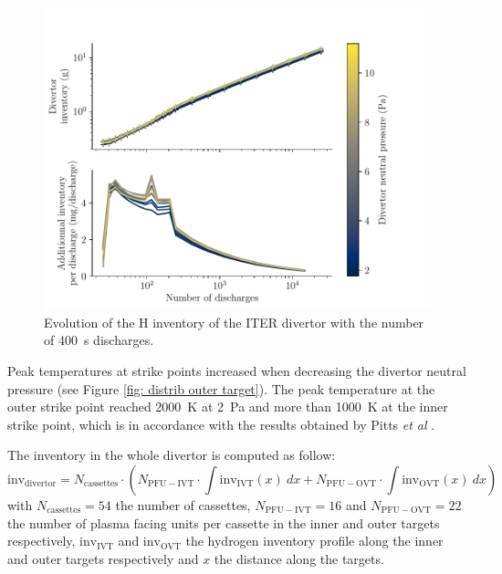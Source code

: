 \begin{figure}[h!]
    \centering
    \includegraphics[width=\linewidth]{Figures/divertor/ITER/inventory_vs_time.pdf}
    \caption{Evolution of the H inventory of the ITER divertor with the number of \SI{400}{s} discharges.}
    \label{fig: iter vs time}
\end{figure}


Peak temperatures at strike points increased when decreasing the divertor neutral pressure (see Figure \ref{fig: distrib outer target}).
The peak temperature at the outer strike point reached \SI{2000}{K} at \SI{2}{Pa} and more than \SI{1000}{K} at the inner strike point, which is in accordance with the results obtained by Pitts \textit{et al} .

The inventory in the whole divertor is computed as follow:
\begin{equation}
    \mathrm{inv_{divertor}} = N_\mathrm{cassettes} \cdot \left( N_\mathrm{PFU-IVT} \cdot \int \mathrm{inv_{IVT}}(x)\: dx + N_\mathrm{PFU-OVT} \cdot\int \mathrm{inv_{OVT}}(x) \: dx \right)
\end{equation}
with $N_\mathrm{cassettes}=54$ the number of cassettes, $N_\mathrm{PFU-IVT}=16$ and $N_\mathrm{PFU-OVT}=22$ the number of plasma facing units per cassette in the inner and outer targets respectively, $\mathrm{inv_{IVT}}$ and $\mathrm{inv_{OVT}}$ the hydrogen inventory profile along the inner and outer targets respectively and $x$ the distance along the targets.

